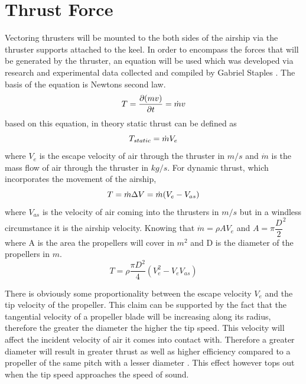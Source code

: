 \documentclass[../main.tex]{subfiles}
\begin{document}
\section{Thrust Force} \label{appendix:thrust}

Vectoring thrusters will be mounted to the both sides of the airship via the thruster supports attached to the keel. In order to encompass the forces that will be generated by the thruster, an equation will be used which was developed via research and experimental data collected and compiled by Gabriel Staples \cite{thrusteq}. The basis of the equation is Newtons second law.
	\begin{displaymath}
	T = {\dfrac{\partial (mv)}{\partial t}} = \dot{m}v\\
	\end{displaymath}
		based on this equation, in theory static thrust can be defined as
	\begin{displaymath}
		T_{static}  = \dot{m}V_{e}\\
	\end{displaymath}
	where $V_{e}$ is the escape velocity of air through the thruster in $m/s$ and $\dot{m}$ is the mass flow of air through the thruster in $kg/s$. For dynamic thrust, which incorporates the movement of the airship,
	\begin{displaymath}
	T  = \dot{m}\Delta V = \dot{m}(V_{e}-V_{as})\\
	\end{displaymath}
	where $V_{as}$ is the velocity of air coming into the thrusters in $m/s$ but in a windless circumstance it is the airship velocity. Knowing that $\dot{m} = \rho A V_{e}$ and $A = \pi {\dfrac{D}{2}}^2$ where A is the area the propellers will cover in $m^2$ and D is the diameter of the propellers in $m$.
	\begin{equation}
    \label{eqn:thrusttheoretical}
	T = \rho \dfrac{\pi D^2}{4} (V_{e}^2 - V_{e} V_{as})
	\end{equation}
    
There is obviously some proportionality between the escape velocity $V_{e}$ and the tip velocity of the propeller. This claim can be supported by the fact that the tangential velocity of a propeller blade will be increasing along its radius, therefore the greater the diameter the higher the tip speed. This velocity will affect the incident velocity of air it comes into contact with. Therefore a greater diameter will result in greater thrust as well as higher efficiency compared to a propeller of the same pitch with a lesser diameter \cite{thrusteq}. This effect however tops out when the tip speed approaches the speed of sound.\\
\end{document}
